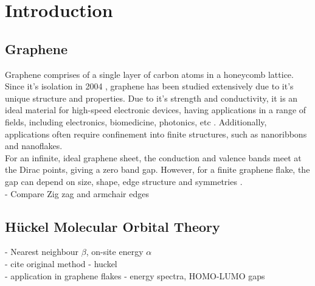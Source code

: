 \chapter{Introduction}\label{ch:introduction}


\section{Graphene}
Graphene comprises of a single layer of carbon atoms in a honeycomb lattice. Since it's isolation in 2004 \parencite{novoselov_electric_2004}, graphene has been studied extensively due to it's unique structure and properties. Due to it's strength and conductivity, it is an ideal material for high-speed electronic devices, having applications in a range of fields, including electronics, biomedicine, photonics, etc \parencite{singh_graphene_2025}. Additionally, applications often require confinement into finite structures, such as nanoribbons and nanoflakes. \\

\noindent For an infinite, ideal graphene sheet, the conduction and valence bands meet at the Dirac points, giving a zero band gap. However, for a finite graphene flake, the gap can depend on size, shape, edge structure and symmetries \parencite{jeongCalculationElectronicStructures2024}. \\

- Compare Zig zag and armchair edges \\


\section{H\"uckel Molecular Orbital Theory}
- Nearest neighbour $\beta$, on-site energy $\alpha$ \\
- cite original method - huckel \\
- application in graphene flakes
- energy spectra, HOMO-LUMO gaps


